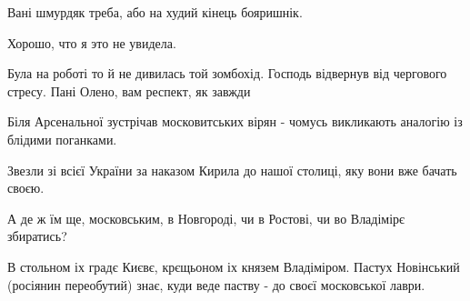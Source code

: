 \begin{itemize}
 
Вані шмурдяк треба, або на худий кінець бояришнік.

 
Хорошо, что я это не увидела.

 
Була на роботі то й не дивилась той зомбохід. Господь відвернув від чергового стресу. Пані Олено, вам респект, як завжди

 
Біля Арсенальної зустрічав московитських вірян - чомусь викликають аналогію із блідими поганками.

 

Звезли зі всієї України за наказом Кирила до нашої столиці, яку вони вже бачать
своєю.

А де ж їм ще, московським, в Новгороді, чи в Ростові, чи во Владімірє
збиратись?

В стольном іх градє Києвє, крєщьоном іх князем Владіміром. Пастух Новінський
(росіянин переобутий) знає, куди веде паству - до своєї московської лаври.

 


\end{itemize}
